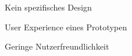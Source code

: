\begin{frame}
\begin{block}{}
	Kein spezifisches Design
\end{block}
\begin{block}{}
	User Experience eines Prototypen
\end{block}
\begin{block}{}
	Geringe Nutzerfreundlichkeit
\end{block}
\end{frame}